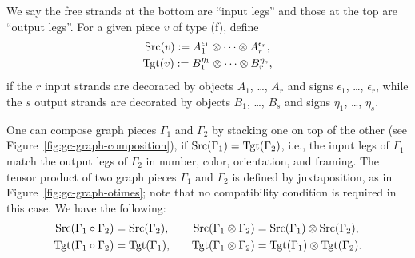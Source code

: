 We say the free strands at the bottom are ``input legs'' and those at
the top are ``output legs''. For a given piece $v$ of type (f), define
\begin{gather*}
  \operatorname{Src}(v) := A_1^{\epsilon_1} \otimes \cdots \otimes A_r^{\epsilon_r},
  \\
  \operatorname{Tgt}(v) := B_1^{\eta_1} \otimes \cdots \otimes B_r^{\eta_s},
\end{gather*}
if the $r$ input strands are decorated by objects $A_1$, \ldots, $A_r$ and
signs $\epsilon_1$, \ldots, $\epsilon_r$, while the $s$ output strands are decorated
by objects $B_1$, \ldots, $B_s$ and signs $\eta_1$, \ldots, $\eta_s$.

One can compose graph pieces $\Gamma_1$ and $\Gamma_2$ by stacking one on top
of the other (see Figure~\ref{fig:gc-graph-composition}), if $\operatorname{Src}(\Gamma_1) =
\operatorname{Tgt}(\Gamma_2)$, i.e., the input legs of $\Gamma_1$ match the output legs of
$\Gamma_2$ in number, color, orientation, and framing. The tensor product
of two graph pieces $\Gamma_1$ and $\Gamma_2$ is defined by juxtaposition, as
in Figure~\ref{fig:gc-graph-otimes}; note that no compatibility condition
is required in this case. We have the following:
\begin{align}
  \label{eq:src-comp-otimes}
  \operatorname{Src}(\Gamma_1 \circ \Gamma_2) &= \operatorname{Src}(\Gamma_2), 
  &&&
  \operatorname{Src}(\Gamma_1 \otimes \Gamma_2) &= \operatorname{Src}(\Gamma_1) \otimes \operatorname{Src}(\Gamma_2),
  \\
  \label{eq:tgt-comp-otimes}
  \operatorname{Tgt}(\Gamma_1 \circ \Gamma_2) &= \operatorname{Tgt}(\Gamma_1),
  &&&
  \operatorname{Tgt}(\Gamma_1 \otimes \Gamma_2) &= \operatorname{Tgt}(\Gamma_1) \otimes \operatorname{Tgt}(\Gamma_2).
\end{align}

